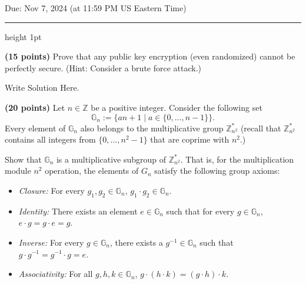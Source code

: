 \documentclass[12pt]{hw}
\newcommand{\Z}{\mathbb{Z}}
\newcommand{\G}{\mathbb{G}}
\begin{document}
\maketitle

\begin{center} Due: Nov 7, 2024 (at 11:59 PM US Eastern Time) \\[10pt]
  \hrule height 1pt
\end{center}

\toggletrue{answers}

\setcounter{MaxMatrixCols}{20} \setlength\parindent{0pt}




\begin{exercise}
{\bf (15 points)}
Prove that any public key encryption (even randomized) cannot be perfectly secure. 
(Hint: Consider a brute force attack.)
\end{exercise}
\begin{answer}
Write Solution Here.
\end{answer}


\begin{exercise}
     {\bf (20 points)} Let $n\in\Z$ be a positive integer. Consider the
    following set $$\G_n := \{ an + 1 \mid a \in \{0, \ldots, n-1\} \}.$$
    Every element of $\G_n$ also belongs to the multiplicative group $\Z_{n^2}^*$ (recall that  $\Z_{n^2}^*$ contains all integers from $\{0,...,n^2-1\}$ that are coprime with $n^2$.)

    Show that $\G_n$ is a multiplicative subgroup of $\Z_{n^2}^*$. That is, for the multiplication module $n^2$ operation, the
            elements of $G_n$ satisfy the following group axioms:
            \begin{itemize}
              \item \textit{Closure: }For every $g_1, g_2 \in \G_n$, $g_1\cdot
                      g_2 \in \G_n$.
              \item \textit{Identity: }There exists an element $e \in \G_n$ such
                    that for every $g \in \G_n$, $e\cdot g = g\cdot e = g$.
              \item \textit{Inverse: }For every $g \in \G_n$, there exists a $g^
                        {-1} \in \G_n$ such that $g\cdot g^{-1} = g^{-1}\cdot g = e$.
              \item \textit{Associativity: } For all $g, h, k \in \G_n$, $g\cdot
                      (h\cdot k) =(g\cdot h)\cdot k$.
            \end{itemize}
\end{exercise}
\end{document}
